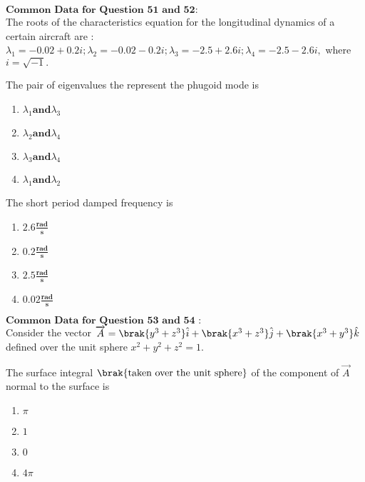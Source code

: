$\textbf{Common Data for Question 51 and 52:}$\\
The roots of the characteristics equation for the longitudinal dynamics of a certain aircraft are :
$\lambda_{1}=-0.02+0.2i;\lambda_{2}=-0.02-0.2i; \lambda_{3}=-2.5+2.6i; \lambda_{4}=-2.5-2.6i,$ where $i=\sqrt{-1}.$\bigskip
\item The pair of eigenvalues the represent the phugoid mode is 
\begin{multicols}{4}
    \begin{enumerate}
        \item $\lambda_{1} \textbf{and} \lambda_{3}$
        \item $\lambda_{2} \textbf{and} \lambda_{4}$
        \item $\lambda_{3} \textbf{and} \lambda_{4}$
        \item $\lambda_{1} \textbf{and} \lambda_{2}$        
    \end{enumerate}
\end{multicols}
\bigskip
\item  The short period damped frequency is 
\begin{multicols}{4}
    \begin{enumerate}
        \item $2.6\frac{\textbf{rad}}{\textbf{s}}$
        \item $0.2\frac{\textbf{rad}}{\textbf{s}}$
        \item $2.5\frac{\textbf{rad}}{\textbf{s}}$
        \item $0.02\frac{\textbf{rad}}{\textbf{s}}$        
    \end{enumerate}
\end{multicols}
\bigskip
$\textbf{Common Data for Question 53 and 54 :}$\\
Consider the vector $\overrightarrow{A}=\brak{y^{3}+z^{3}}\hat{i}+\brak{x^{3}+z^{3}}\hat{j}+\brak{x^{3}+y^{3}}\hat{k}$ defined over the unit sphere $x^{2}+y^{2}+z^{2}=1.$\bigskip
\item The surface integral $\brak{\text{taken over the unit sphere}}$ of the component of $\overrightarrow{A}$ normal to the surface is
\begin{multicols}{4}
    \begin{enumerate}
        \item $\pi$
        \item $1$
        \item $0$
        \item $4\pi$        
    \end{enumerate}
\end{multicols}

